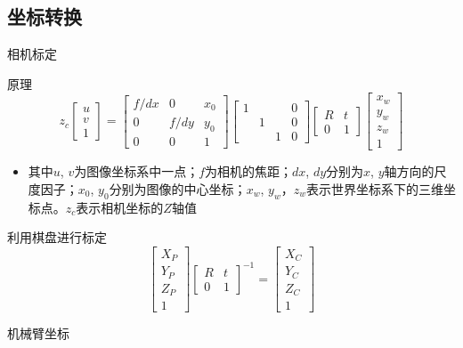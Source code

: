 \documentclass[xcolor=table,compress,blue]{beamer}
\begin{document}
	\subsection{坐标转换}
	\begin{frame}{相机标定}
		\vspace{-8pt}
		\begin{exampleblock}{原理}
			\begin{equation*} 
				z_c	\begin{bmatrix} u\\  v\\  1 \end{bmatrix} =
				\begin{bmatrix} f/dx & 0 & x_{0} \\  0 & f/dy & y_{0} \\  0 & 0 & 1 \end{bmatrix} 
				\begin{bmatrix} 1 &  &  & 0\\  & 1 &  & 0\\   &  & 1 & 0  \end{bmatrix} 
				\begin{bmatrix} R & t\\ 0 & 1 \end{bmatrix} 
				\begin{bmatrix} x_{w}\\  y_{w}\\  z_{w}\\  1 \end{bmatrix}
			\end{equation*}
			\begin{itemize}
				\item \footnotesize{其中$u$, $v$为图像坐标系中一点；$f$为相机的焦距；$dx$, $dy$分别为$x$, $y$轴方向的尺度因子；$x_0$, $y_0$分别为图像的中心坐标；$x_w$, $y_w$，$z_w$表示世界坐标系下的三维坐标点。$z_c$表示相机坐标的$Z$轴值}
			\end{itemize}
		\end{exampleblock}
		\vspace{-16pt}
		\begin{exampleblock}{利用棋盘进行标定}
			\begin{equation*}  
				\begin{bmatrix} X_P\\  Y_P\\  Z_P \\ 1 \end{bmatrix}		\begin{bmatrix} R & t\\ 0 & 1 \end{bmatrix}^{-1} =
				\begin{bmatrix} X_{C}\\  Y_{C}\\  Z_{C}\\  1 \end{bmatrix}
			\end{equation*}
		\end{exampleblock}
	\end{frame}	
	\begin{frame}{机械臂坐标}
		
	\end{frame}
	
\end{document}
